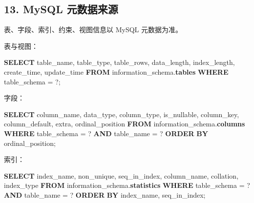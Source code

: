 \documentclass[
  a4paper,
  UTF8]{ctexart}
\newenvironment{Shaded}{}{}
\newcommand{\KeywordTok}[1]{\textcolor[rgb]{0.00,0.44,0.13}{\textbf{#1}}}
\newcommand{\NormalTok}[1]{#1}
\newcommand{\OperatorTok}[1]{\textcolor[rgb]{0.40,0.40,0.40}{#1}}
\begin{document}
\hypertarget{mysql-ux5143ux6570ux636eux6765ux6e90}{%
\subsection{13. MySQL
元数据来源}\label{mysql-ux5143ux6570ux636eux6765ux6e90}}

表、字段、索引、约束、视图信息以 MySQL 元数据为准。

表与视图：

\begin{Shaded}
\begin{Highlighting}[]
\KeywordTok{SELECT}\NormalTok{ table\_name, table\_type, table\_rows, data\_length, index\_length, create\_time, update\_time}
\KeywordTok{FROM}\NormalTok{ information\_schema.}\KeywordTok{tables}
\KeywordTok{WHERE}\NormalTok{ table\_schema }\OperatorTok{=}\NormalTok{ ?;}
\end{Highlighting}
\end{Shaded}

字段：

\begin{Shaded}
\begin{Highlighting}[]
\KeywordTok{SELECT}
\NormalTok{  column\_name,}
\NormalTok{  data\_type,}
\NormalTok{  column\_type,}
\NormalTok{  is\_nullable,}
\NormalTok{  column\_key,}
\NormalTok{  column\_default,}
\NormalTok{  extra,}
\NormalTok{  ordinal\_position}
\KeywordTok{FROM}\NormalTok{ information\_schema.}\KeywordTok{columns}
\KeywordTok{WHERE}\NormalTok{ table\_schema }\OperatorTok{=}\NormalTok{ ?}
  \KeywordTok{AND}\NormalTok{ table\_name }\OperatorTok{=}\NormalTok{ ?}
\KeywordTok{ORDER} \KeywordTok{BY}\NormalTok{ ordinal\_position;}
\end{Highlighting}
\end{Shaded}

索引：

\begin{Shaded}
\begin{Highlighting}[]
\KeywordTok{SELECT}
\NormalTok{  index\_name,}
\NormalTok{  non\_unique,}
\NormalTok{  seq\_in\_index,}
\NormalTok{  column\_name,}
\NormalTok{  collation,}
\NormalTok{  index\_type}
\KeywordTok{FROM}\NormalTok{ information\_schema.}\KeywordTok{statistics}
\KeywordTok{WHERE}\NormalTok{ table\_schema }\OperatorTok{=}\NormalTok{ ?}
  \KeywordTok{AND}\NormalTok{ table\_name }\OperatorTok{=}\NormalTok{ ?}
\KeywordTok{ORDER} \KeywordTok{BY}\NormalTok{ index\_name, seq\_in\_index;}
\end{Highlighting}
\end{Shaded}
\end{document}
